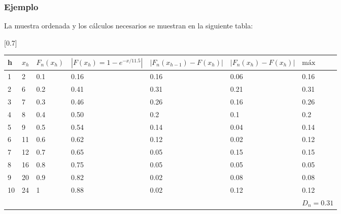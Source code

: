 \begin{frame}      
\frametitle{Ejemplo}
           La muestra ordenada  y los cálculos necesarios se muestran en la siguiente tabla:
           
              

 
\begin{table}
\centering
\scalebox{0.70}[0.7]{
         \begin{tabular}{lllllll}
h & $x_h$ & $F_n(x_h)$ & $|F(x_h)=1- e ^{-x/11.5}|$& $|F_n(x_{h-1})-F(x_h)| $& $|F_n(x_{h})-F(x_h)| $& $\mbox{máx}$ \\\hline
           1 & 2  & 0.1 & 0.16 & 0.16 & 0.06 & 0.16\\ 
           2 & 6  & 0.2 & 0.41 & 0.31 & 0.21 & 0.31\\
           3 & 7  & 0.3 & 0.46 & 0.26 & 0.16 & 0.26\\
           4 & 8   & 0.4 & 0.50 & 0.2 & 0.1 & 0.2\\
           5 & 9  & 0.5  & 0.54 & 0.14 & 0.04 & 0.14\\
           6 & 11 & 0.6 & 0.62 & 0.12 & 0.02 &0.12\\
           7 & 12 & 0.7 & 0.65&0.05& 0.15& 0.15\\
           8 & 16 & 0.8 & 0.75& 0.05& 0.05 & 0.05\\
           9 & 20 & 0.9 & 0.82&0.02 & 0.08 &  0.08\\
           10 & 24 & 1 & 0.88& 0.02 & 0.12 & 0.12\\
           & & & & &  &$ D_n=0.31$\\
           \end{tabular}
}
\end{table}           
\end{frame}

